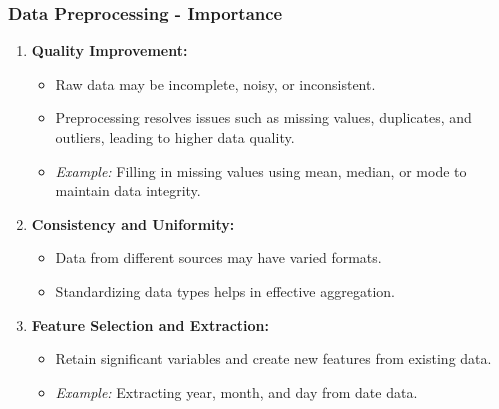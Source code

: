 \documentclass{beamer}
\begin{document}
\begin{frame}[fragile]
    \frametitle{Data Preprocessing - Importance}
    \begin{enumerate}
        \item \textbf{Quality Improvement:}
            \begin{itemize}
                \item Raw data may be incomplete, noisy, or inconsistent.
                \item Preprocessing resolves issues such as missing values, duplicates, and outliers, leading to higher data quality.
                \item \textit{Example:} Filling in missing values using mean, median, or mode to maintain data integrity.
            \end{itemize}
        
        \item \textbf{Consistency and Uniformity:}
            \begin{itemize}
                \item Data from different sources may have varied formats.
                \item Standardizing data types helps in effective aggregation.
            \end{itemize}
        
        \item \textbf{Feature Selection and Extraction:}
            \begin{itemize}
                \item Retain significant variables and create new features from existing data.
                \item \textit{Example:} Extracting year, month, and day from date data.
            \end{itemize}
    \end{enumerate}
\end{frame}
\end{document}
